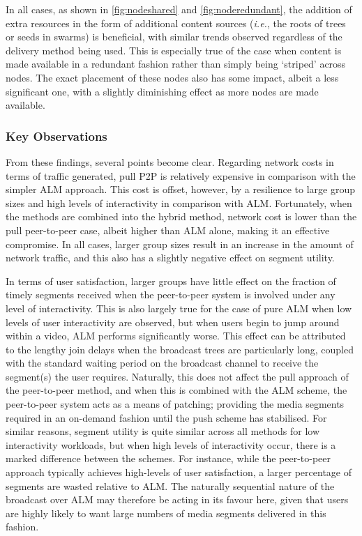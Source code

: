 In all cases, as shown in \autoref{fig:nodeshared} and \autoref{fig:noderedundant}, the addition of extra resources in the form of additional content sources (\emph{i.e.}, the roots of trees or seeds in swarms) is beneficial, with similar trends observed regardless of the delivery method being used. This is especially true of the case when content is made available in a redundant fashion rather than simply being `striped' across nodes. The exact placement of these nodes also has some impact, albeit a less significant one, with a slightly diminishing effect as more nodes are made available.

\subsubsection{Key Observations}

From these findings, several points become clear. Regarding network costs in terms of traffic generated, pull P2P is relatively expensive in comparison with the simpler ALM approach. This cost is offset, however, by a resilience to large group sizes and high levels of interactivity in comparison with ALM. Fortunately, when the methods are combined into the hybrid method, network cost is lower than the pull peer-to-peer case, albeit higher than ALM alone, making it an effective compromise. In all cases, larger group sizes result in an increase in the amount of network traffic, and this also has a slightly negative effect on segment utility.

In terms of user satisfaction, larger groups have little effect on the fraction of timely segments received when the peer-to-peer system is involved under any level of interactivity. This is also largely true for the case of pure ALM when low levels of user interactivity are observed, but when users begin to jump around within a video, ALM performs significantly worse. This effect can be attributed to the lengthy join delays when the broadcast trees are particularly long, coupled with the standard waiting period on the broadcast channel to receive the segment(s) the user requires. Naturally, this does not affect the pull approach of the peer-to-peer method, and when this is combined with the ALM scheme, the peer-to-peer system acts as a means of patching; providing the media segments required in an on-demand fashion until the push scheme has stabilised. For similar reasons, segment utility is quite similar across all methods for low interactivity workloads, but when high levels of interactivity occur, there is a marked difference between the schemes. For instance, while the peer-to-peer approach typically achieves high-levels of user satisfaction, a larger percentage of segments are wasted relative to ALM. The naturally sequential nature of the broadcast over ALM may therefore be acting in its favour here, given that users are highly likely to want large numbers of media segments delivered in this fashion.

